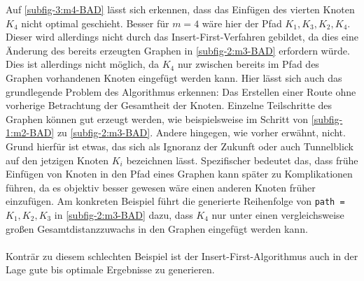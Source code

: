 Auf \vref{subfig-3:m4-BAD} lässt sich erkennen, dass das Einfügen des vierten Knoten $K_4$ nicht optimal geschieht. 
Besser für $m = 4$ wäre hier der Pfad $K_1, K_3, K_2, K_4$. 
Dieser wird allerdings nicht durch das Insert-First-Verfahren gebildet, da dies eine Änderung des bereits erzeugten Graphen in \vref{subfig-2:m3-BAD} erfordern würde. 
Dies ist allerdings nicht möglich, da $K_4$ nur zwischen bereits im Pfad des Graphen vorhandenen Knoten eingefügt werden kann. 
Hier lässt sich auch das grundlegende Problem des Algorithmus erkennen: Das Erstellen einer Route ohne vorherige Betrachtung der Gesamtheit der Knoten. 
Einzelne Teilschritte des Graphen können gut erzeugt werden, wie beispielsweise im Schritt von \vref{subfig-1:m2-BAD} zu \vref{subfig-2:m3-BAD}. 
Andere hingegen, wie vorher erwähnt, nicht. Grund hierfür ist etwas, das sich als Ignoranz der Zukunft oder auch Tunnelblick auf den jetzigen Knoten $K_i$ bezeichnen lässt. 
Spezifischer bedeutet das, dass frühe Einfügen von Knoten in den Pfad eines Graphen kann später zu Komplikationen führen, da es objektiv besser gewesen wäre einen anderen Knoten früher einzufügen.
Am konkreten Beispiel führt die generierte Reihenfolge von \lstinline{path =} $K_1, K_2, K_3$ in \vref{subfig-2:m3-BAD} dazu, dass $K_4$ nur unter einen vergleichsweise großen Gesamtdistanzzuwachs in den Graphen eingefügt werden kann. \\\\
Konträr zu diesem schlechten Beispiel ist der Insert-First-Algorithmus auch in der Lage gute bis optimale Ergebnisse zu generieren. 

